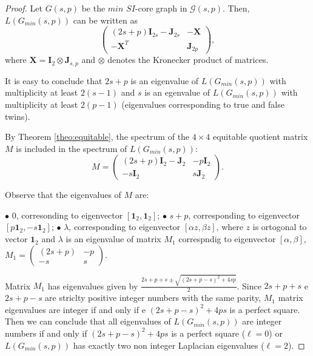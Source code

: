 \documentclass[preprint,12pt]{elsarticle}
\begin{document}
\begin{proof}
Let  $G(s,p)$ be the $min$ $SI$-core graph in $\mathcal{G}(s,p)$. 
Then,  $L(G_{min}(s,p))$ can be written as 
$$
    \begin{pmatrix}

    (2s+p) \mathbf{I}_{2s} - \mathbf{J}_{2s} & -\mathbf{X} \\
    -\mathbf{X}^T                            & \mathbf{J}_{2p}
    \end{pmatrix}
   , $$
where $\mathbf{X} = \mathbf{I}_2 \otimes \mathbf{J}_{s,p}$ and $\otimes$ denotes the Kronecker product of matrices.
\newline

It is easy to conclude that $2s +p$ is an eigenvalue of $L(G_{min}(s,p))$ with multiplicity at least $2(s-1)$ and $s$ is an egenvalue of $L(G_{min}(s,p))$ with multiplicity at least $2(p-1)$ (eigenvalues corresponding to true and false twins).

By Theorem \ref{theo:equitable}, the spectrum of the $4 \times 4$ equitable quotient matrix $M$ is included in the spectrum of $L(G_{min}(s,p))$:  
$$M =
    \begin{pmatrix}
    (2s+p) \mathbf{I}_2 - \mathbf{J}_2 & - p \mathbf{I}_2 \\
    - s \mathbf{I}_2                       &    s \mathbf{J}_2
    \end{pmatrix}
.$$ 

Observe that the eigenvalues of $M$ are:

\noindent $\bullet$ $0$, corresonding to eigenvector $[\mathbf{1}_2, \mathbf{1}_2]$;\newline
$\bullet$ $s+p$, corresponding to eigenvector $[p\mathbf{1}_2, -s\mathbf{1}_2]$; \newline
$\bullet$ $\lambda$, corresponding to eigenvector $[\alpha z, \beta z]$, 
where $z$ is ortogonal to vector $\mathbf{1}_2$ and $\lambda$ is an eigenvalue of matrix $M_1$ correspndig to eigenvector 
$[\alpha, \beta]$, $M_1 =     \begin{pmatrix}
 (2s+p)  & - p \\
 -s       &   s
    \end{pmatrix}
$.

Matrix $M_1$ has eigenvalues given by  
$\frac{2s+p+s \pm \sqrt{(2s+p-s)^2 + 4sp}}{2}$. 
Since $2s+p+s$ e $2s+p-s$ are striclty positive integer numbers with the same parity, $M_1$ matrix eigenvalues are integer if and only if e  $(2s+p-s)^2 + 4ps$ is a perfect square. 
Then we can conclude that all eigenvalues of $L(G_{min}(s,p))$ are integer numbers if and only if 
 $(2s+p-s)^2 + 4ps$ is a perfect square ($\ell = 0$) or $L(G_{min}(s,p))$ has exactly two non integer Laplacian eigenvalues ($\ell = 2$).
\end{proof}
\end{document}
